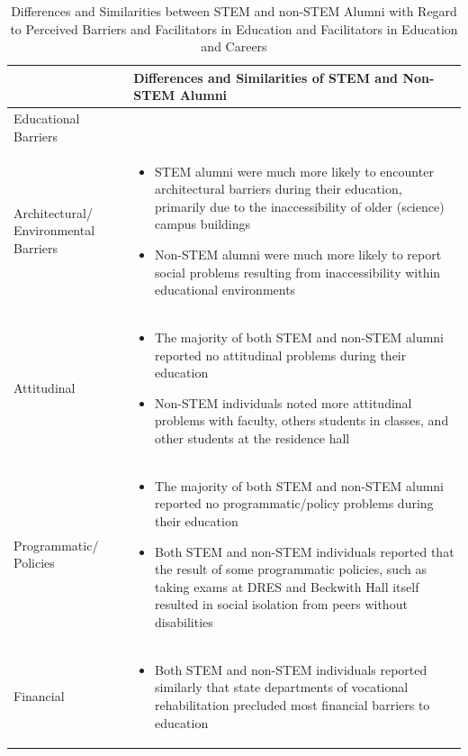 \documentclass[11.5pt]{sig-alternate} %
\begin{document}
\begin{large}
\begin{table}[thp]
\caption{Differences and Similarities between STEM and non-STEM Alumni with Regard to Perceived Barriers and Facilitators in Education and Facilitators in Education and Careers}
\begin{tabular}{|l|l|}
\hline
& Differences and Similarities of STEM and Non-STEM Alumni \\ \hline
Educational Barriers & \\ \hline
Architectural/ Environmental Barriers & 
\begin{itemize}[noitemsep, topsep=0pt, leftmargin=*]
\item STEM alumni were much more likely to encounter architectural barriers during their education, primarily due to the inaccessibility of older (science) campus buildings
\item Non-STEM alumni were much more likely to report social problems resulting from inaccessibility within educational environments
\end{itemize} \\ \hline
Attitudinal &
\begin{itemize}[noitemsep, topsep=0pt, leftmargin=*]
\item The majority of both STEM and non-STEM alumni reported no attitudinal problems during their education
\item Non-STEM individuals noted more attitudinal problems with faculty, others students in classes, and other students at the residence hall
\end{itemize} \\ \hline
Programmatic/ Policies &
\begin{itemize}[noitemsep, topsep=0pt, leftmargin=*]
\item The majority of both STEM and non-STEM alumni reported no programmatic/policy problems during their education
\item Both STEM and non-STEM individuals reported that the result of some programmatic policies, such as taking exams at DRES and Beckwith Hall itself resulted in social isolation from peers without disabilities
\end{itemize} \\ \hline
Financial &
\begin{itemize}[noitemsep, topsep=0pt, leftmargin=*]
\item Both STEM and non-STEM individuals reported similarly that state departments of vocational rehabilitation precluded most financial barriers to education
\end{itemize} \\ \hline

\end{tabular}
\end{table}
\end{large}
\end{document}
